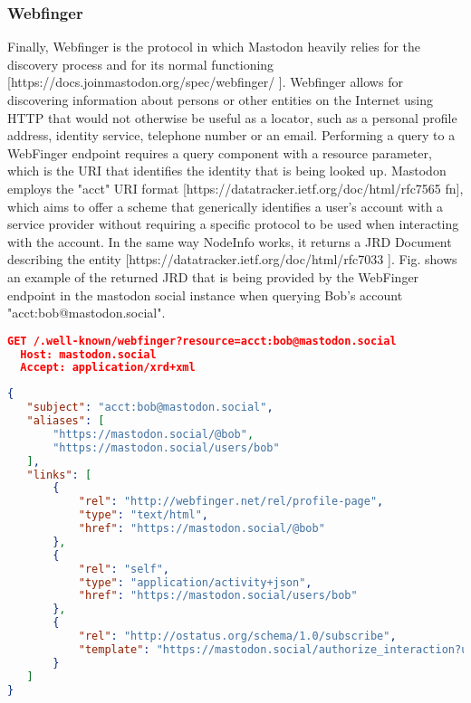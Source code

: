 \subsubsection{Webfinger}
Finally, Webfinger is the protocol in which Mastodon heavily relies for the discovery process and for its normal functioning [https://docs.joinmastodon.org/spec/webfinger/ ]. Webfinger allows for discovering information about persons or other entities on the Internet using HTTP that would not otherwise be useful as a locator, such as a personal profile address, identity service, telephone number or an email. Performing a query to a WebFinger endpoint requires a query component with a resource parameter, which is the URI that identifies the identity that is being looked up. Mastodon employs the "acct" URI format [https://datatracker.ietf.org/doc/html/rfc7565 fn], which aims to offer a scheme that generically identifies a user's account with a service provider without requiring a specific protocol to be used when interacting with the account. In the same way NodeInfo works, it returns a JRD Document describing the entity [https://datatracker.ietf.org/doc/html/rfc7033 ].  Fig. \label{Webfinger response from mastodon.social} shows an example of the returned JRD that is being provided by the WebFinger endpoint in the mastodon social instance when querying Bob's account "acct:bob@mastodon.social".

\begin{lstlisting}[language=Json, caption=HTTP request to Webfinger endpoint, label=Webfinger request]
  GET /.well-known/webfinger?resource=acct:bob@mastodon.social
  Host: mastodon.social
  Accept: application/xrd+xml
\end{lstlisting}

\begin{lstlisting}[language=Json, caption=Webfinger response, label=Webfinger response from mastodon.social]
{
   "subject": "acct:bob@mastodon.social",
   "aliases": [
       "https://mastodon.social/@bob",
       "https://mastodon.social/users/bob"
   ],
   "links": [
       {
           "rel": "http://webfinger.net/rel/profile-page",
           "type": "text/html",
           "href": "https://mastodon.social/@bob"
       },
       {
           "rel": "self",
           "type": "application/activity+json",
           "href": "https://mastodon.social/users/bob"
       },
       {
           "rel": "http://ostatus.org/schema/1.0/subscribe",
           "template": "https://mastodon.social/authorize_interaction?uri={uri}"
       }
   ]
}
\end{lstlisting}

